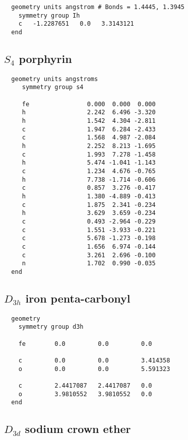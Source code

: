 \begin{verbatim}
  geometry units angstrom # Bonds = 1.4445, 1.3945
    symmetry group Ih
    c   -1.2287651   0.0   3.3143121
  end
\end{verbatim}

  \subsection{\protect$S_4$ porphyrin}

\begin{verbatim}
  geometry units angstroms
     symmetry group s4
  
     fe                0.000  0.000  0.000         
     h                 2.242  6.496 -3.320   
     h                 1.542  4.304 -2.811
     c                 1.947  6.284 -2.433
     c                 1.568  4.987 -2.084
     h                 2.252  8.213 -1.695
     c                 1.993  7.278 -1.458
     h                 5.474 -1.041 -1.143
     c                 1.234  4.676 -0.765
     h                 7.738 -1.714 -0.606
     c                 0.857  3.276 -0.417
     h                 1.380 -4.889 -0.413
     c                 1.875  2.341 -0.234
     h                 3.629  3.659 -0.234
     c                 0.493 -2.964 -0.229
     c                 1.551 -3.933 -0.221
     c                 5.678 -1.273 -0.198
     c                 1.656  6.974 -0.144
     c                 3.261  2.696 -0.100
     n                 1.702  0.990 -0.035
  end
\end{verbatim}

  \subsection{\protect$D_{3h}$ iron penta-carbonyl}

\begin{verbatim}
  geometry
    symmetry group d3h

    fe        0.0         0.0         0.0

    c         0.0         0.0         3.414358
    o         0.0         0.0         5.591323

    c         2.4417087   2.4417087   0.0
    o         3.9810552   3.9810552   0.0
  end
\end{verbatim}

  \subsection{\protect$D_{3d}$ sodium crown ether}

